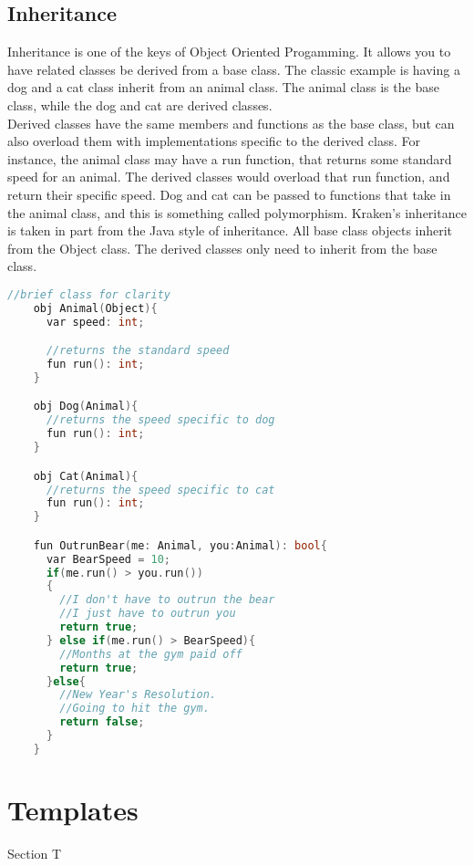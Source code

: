 \documentclass{article}
\begin{document}
  \subsection{Inheritance}
    Inheritance is one of the keys of Object Oriented Progamming.  It allows you
  to have related classes be derived from a base class.  The classic example is
  having a dog and a cat class inherit from an animal class.  The animal class
  is the base class, while the dog and cat are derived classes.  \\ 
    Derived classes have the same members and functions as the base class, but can 
  also overload them with implementations specific to the derived class.  For 
  instance, the animal class may have a run function, that returns some standard 
  speed for an animal.  The derived classes would overload that run function, 
  and return their specific speed. Dog and cat can be passed to functions that 
  take in the animal class, and this is something called polymorphism.  
  Kraken's inheritance is taken in part from the Java style of inheritance.
  All base class objects inherit from the Object class.  The derived classes
  only need to inherit from the base class.
  \begin{lstlisting}[language=C++]
    //brief class for clarity 
    obj Animal(Object){
      var speed: int;

      //returns the standard speed
      fun run(): int;
    }

    obj Dog(Animal){
      //returns the speed specific to dog
      fun run(): int;
    }

    obj Cat(Animal){
      //returns the speed specific to cat
      fun run(): int;
    }

    fun OutrunBear(me: Animal, you:Animal): bool{
      var BearSpeed = 10;
      if(me.run() > you.run())
      {
        //I don't have to outrun the bear
        //I just have to outrun you
        return true;
      } else if(me.run() > BearSpeed){
        //Months at the gym paid off 
        return true;
      }else{
        //New Year's Resolution.
        //Going to hit the gym.
        return false;
      }
    }
  \end{lstlisting}

\section{Templates}
  Section T
\end{document}

